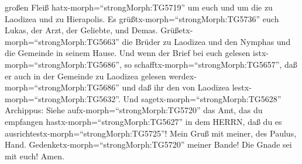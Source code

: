 großen Fleiß hatx-morph=``strongMorph:TG5719'' um euch und um die zu
Laodizea und zu Hierapolis.  Es
grüßtx-morph=``strongMorph:TG5736'' euch Lukas, der Arzt, der Geliebte,
und Demas.  Grüßetx-morph=``strongMorph:TG5663'' die Brüder
zu Laodizea und den Nymphas und die Gemeinde in seinem Hause.
 Und wenn der Brief bei euch gelesen
istx-morph=``strongMorph:TG5686'', so
schafftx-morph=``strongMorph:TG5657'', daß er auch in der Gemeinde zu
Laodizea gelesen werdex-morph=``strongMorph:TG5686'' und daß ihr den von
Laodizea lestx-morph=``strongMorph:TG5632''.  Und
sagetx-morph=``strongMorph:TG5628'' Archippus: Siehe
aufx-morph=``strongMorph:TG5720'' das Amt, das du empfangen
hastx-morph=``strongMorph:TG5627'' in dem HERRN, daß du es
ausrichtestx-morph=``strongMorph:TG5725''!  Mein Gruß mit
meiner, des Paulus, Hand. Gedenketx-morph=``strongMorph:TG5720'' meiner
Bande! Die Gnade sei mit euch! Amen.
